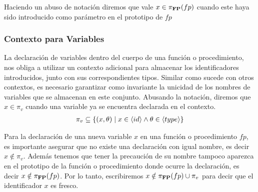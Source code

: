 Haciendo un abuso de notación diremos que vale $x \in \pi_{\mathbf{FP}}(fp)$ cuando este haya sido introducido como parámetro en el prototipo de $fp$

\subsubsection{Contexto para Variables}

La declaración de variables dentro del cuerpo de una función o procedimiento, nos obliga a utilizar un contexto adicional para almacenar los identificadores introducidos, junto con sus correspondientes tipos.
Similar como sucede con otros contextos, es necesario garantizar como invariante la unicidad de los nombres de variables que se almacenan en este conjunto.
Abusando la notación, diremos que $x \in \pi_{v}$ cuando una variable ya se encuentra declarada en el contexto.
\begin{gather*}
\pi_{v} \subseteq \{ (x, \theta) \mid x \in \langle id \rangle \wedge \theta \in \langle type \rangle \}
\end{gather*}

Para la declaración de una nueva variable $x$ en una función o procedimiento $fp$, es importante asegurar que no existe una declaración con igual nombre, es decir  $x \notin \pi_{v}$. Además tenemos que tener la precaución de su nombre tampoco aparezca en el prototipo de la función o procedimiento donde ocurre la declaración, es decir $x \notin \pi_{\mathbf{FP}}(fp)$.
Por lo tanto, escribiremos $x \notin \pi_{\mathbf{FP}}(fp) \cup
\pi_{v}$ para decir que el identificador $x$ es fresco.

